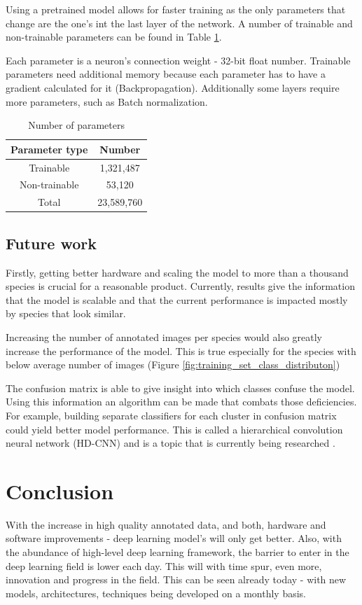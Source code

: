 \documentclass[times, utf8, diplomski]{fer}
\begin{document}
Using a pretrained model allows for faster training as the only parameters that change are the one's int the last layer of the network. A number of trainable and non-trainable parameters can be found in Table \ref{tb:model_params}.

Each parameter is a neuron's connection weight - 32-bit float number. Trainable parameters need additional memory because each parameter has to have a gradient calculated for it (Backpropagation). Additionally some layers require more parameters, such as Batch normalization. 

\begin{table}
\centering
\caption{Number of parameters}
\label{tb:model_params}
\begin{tabular}{cc}
\hline 
Parameter type & Number \\ \hline 
Trainable &   1,321,487\\ 
Non-trainable & 53,120 \\ 
Total & 23,589,760 \\
\hline 
\end{tabular} 
\end{table}

\section{Future work}
\label{se:future_work}

Firstly, getting better hardware and scaling the model to more than a thousand species is crucial for a reasonable product. Currently, results give the information that the model is scalable and that the current performance is impacted mostly by species that look similar. 

Increasing the number of annotated images per species would also greatly increase the performance of the model. This is true especially for the species with below average number of images (Figure \ref{fig:training_set_class_distributon})

The confusion matrix is able to give insight into which classes confuse the model. Using this information an algorithm can be made that combats those deficiencies. For example, building separate classifiers for each cluster in confusion matrix could yield better model performance. This is called a hierarchical convolution neural network (HD-CNN) and is a topic that is currently being researched \citep{yan_hd-cnn:_2015, yan_hd-cnn:_2015-1}. 

\chapter{Conclusion}
With the increase in high quality annotated data, and both, hardware and software improvements - deep learning model's will only get better. Also, with the abundance of high-level deep learning framework, the barrier to enter in the deep learning field is lower each day. This will with time spur, even more, innovation and progress in the field. This can be seen already today - with new models, architectures, techniques being developed on a monthly basis.
\end{document}
